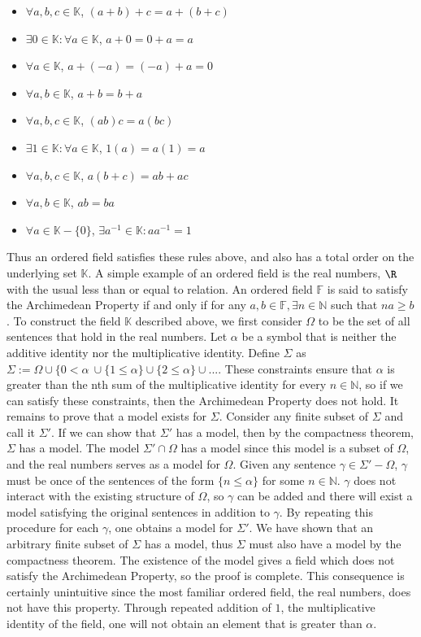 \documentclass[%
 reprint,
 amsmath,amssymb,
 aps,
]{revtex4-2}
\begin{document}
\begin{itemize}
    \item $\forall a,b,c \in \mathbb{K}$, $(a+b)+c = a+(b+c)$
    \item $\exists 0 \in \mathbb{K}:\forall a \in \mathbb{K}$, $a + 0 = 0 + a = a$
    \item $\forall a \in \mathbb{K}$, $a + (-a) = (-a) + a = 0$
    \item $\forall a,b \in \mathbb{K}$, $a + b = b + a$
    \item $\forall a,b,c \in \mathbb{K}$, $(ab)c = a(bc)$
    \item $\exists 1 \in \mathbb{K}:\forall a \in \mathbb{K}$, $1(a) = a(1) = a$
    \item $\forall a,b,c \in \mathbb{K}$, $a(b+c) = ab + ac$
    \item $\forall a,b \in \mathbb{K}$, $ab = ba$
    \item $\forall a \in \mathbb{K} - \{0\}$, $\exists a^{-1} \in \mathbb{K}: aa^{-1} = 1$
    
\end{itemize}
Thus an ordered field satisfies these rules above, and also has a total order on the underlying set $\mathbb{K}$.  A simple example of an ordered field is the real numbers, $\R$ with the usual less than or equal to relation.  An ordered field $\mathbb{F}$ is said to satisfy the Archimedean Property if and only if for any $a,b \in \mathbb{F}, \exists n \in \mathbb{N}$ such that $na \geq b$.  To construct the field $\mathbb{K}$ described above, we first consider $\Omega$ to be the set of all sentences that hold in the real numbers.  Let $\alpha$ be a symbol that is neither the additive identity nor the multiplicative identity.  Define $\Sigma$ as 
$\Sigma := \Omega \cup \{0 < \alpha\ \cup \{1 \leq \alpha\} \cup \{2 \leq \alpha\} \cup ...$.  These constraints ensure that $\alpha$ is greater than the nth sum of the multiplicative identity for every $n \in \mathbb{N}$, so if we can satisfy these constraints, then the Archimedean Property does not hold.  It remains to prove that a model exists for $\Sigma$.  Consider any finite subset of $\Sigma$ and call it $\Sigma'$.  If we can show that $\Sigma'$ has a model, then by the compactness theorem, $\Sigma$ has a model.  The model $\Sigma' \cap \Omega$ has a model since this model is a subset of $\Omega$, and the real numbers serves as a model for $\Omega$.  Given any sentence $\gamma \in \Sigma' - \Omega$, $\gamma$ must be once of the sentences of the form $\{n \leq \alpha\}$ for some $n \in \mathbb{N}$.  $\gamma$ does not interact with the existing structure of $\Omega$, so $\gamma$ can be added and there will exist a model satisfying the original sentences in addition to $\gamma$.  By repeating this procedure for each $\gamma$, one obtains a model for $\Sigma'$.  We have shown that an arbitrary finite subset of $\Sigma$ has a model, thus $\Sigma$ must also have a model by the compactness theorem.  The existence of the model gives a field which does not satisfy the Archimedean Property, so the proof is complete. 
This consequence is certainly unintuitive since the most familiar ordered field, the real numbers, does not have this property.  Through repeated addition of $1$, the multiplicative identity of the field, one will not obtain an element that is greater than $\alpha$. 
\end{document}
